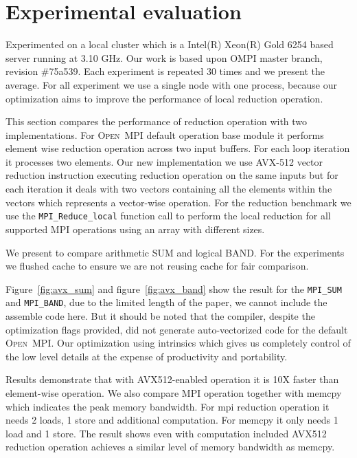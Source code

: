 \documentclass[sigconf]{acmart}
\newcommand{\mpifunc}[1]{\lstinline"MPI_#1"\xspace}
\newcommand{\ompi}[0]{\textsc{Open~MPI}\xspace}
\begin{document}
\section{Experimental evaluation}\label{sec:experiments}
Experimented on a local cluster which is a Intel(R) Xeon(R) Gold 6254 based server running at 3.10 GHz. Our work is based upon OMPI master branch, revision \#75a539. Each experiment is repeated 30 times and we present the average. For all experiment we use a single node with one process, because our optimization aims to improve the performance of local reduction operation.

This section compares the performance of reduction operation with two
implementations.
For \ompi default operation base module it
performs element wise reduction operation across two input buffers. For each loop iteration
it processes two elements. Our new implementation we use AVX-512 vector reduction instruction
executing reduction operation on the same inputs but for each iteration it
deals with two vectors containing all the elements within the vectors which represents
a vector-wise operation.
For the reduction benchmark we use the \mpifunc{Reduce_local} function call to
perform the local reduction for all supported MPI operations using an array with different sizes.

We present to compare arithmetic SUM and logical BAND.
For the experiments we flushed cache to ensure we are not reusing cache for fair comparison.

Figure~\ref{fig:avx_sum} and figure~\ref{fig:avx_band} show the result for the
\mpifunc{SUM} and \mpifunc{BAND}, due to the limited length of the paper, we cannot
include the assemble code here. But it should be noted that the compiler, despite
the optimization flags provided, did not generate auto-vectorized code for the
default \ompi. Our optimization using intrinsics which gives us completely control of the low
level details at the expense of productivity and portability.

Results demonstrate that with AVX512-enabled operation it is 10X faster than element-wise operation. We also compare MPI operation together with memcpy which indicates the peak memory bandwidth. For mpi reduction operation it needs 2 loads, 1 store and additional computation. For memcpy it only needs 1 load and 1 store.
The result shows even with computation included AVX512 reduction operation achieves a similar level of memory bandwidth as memcpy.
\end{document}
